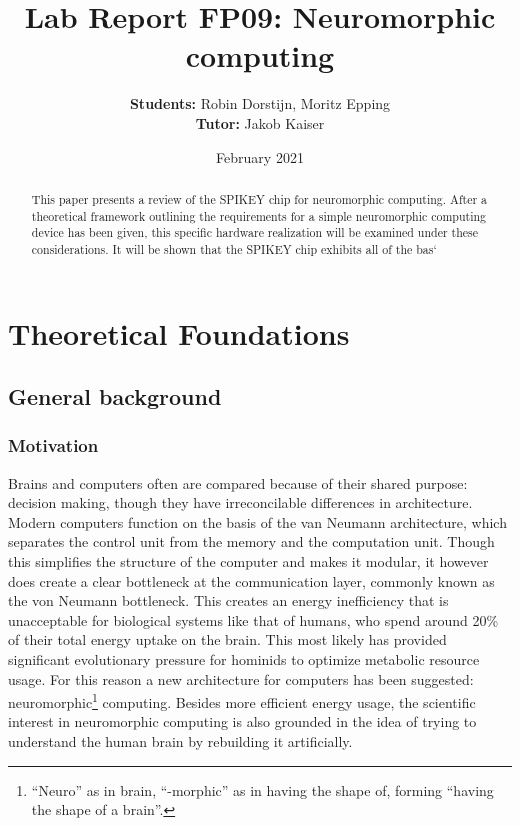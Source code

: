 \documentclass[10pt,a4paper]{article}
\author{\textbf{Students: }Robin Dorstijn, Moritz Epping \\ \textbf{Tutor: }Jakob Kaiser}
\title{Lab Report FP09: Neuromorphic computing}
\date{February 2021}
\begin{document}
\maketitle
\clearpage
\tableofcontents

\clearpage
\begin{abstract}
    This paper presents a review of the SPIKEY chip for neuromorphic
    computing.  After a theoretical framework outlining the requirements
    for a simple neuromorphic computing device has been given, this
    specific hardware realization will be examined under these considerations.
    It will be shown that the SPIKEY chip exhibits all of the bas`
\end{abstract}

\section{Theoretical Foundations}
\subsection{General background}
\subsubsection{Motivation}
Brains and computers often are compared because of their shared purpose:
decision making, though they have irreconcilable differences in architecture.
Modern computers function on the basis of the van Neumann
architecture\cite{von-Neumann}, which separates the control unit from the memory
and the computation unit. Though this simplifies the structure of the computer
and makes it modular, it however does create a clear bottleneck at the
communication layer, commonly known as the von Neumann bottleneck. This creates
an energy inefficiency that is unacceptable for biological systems like that of
humans, who spend around 20\% of their total energy uptake on the
brain\cite{metabolic-rates}.  This most likely has provided significant
evolutionary pressure for hominids to optimize metabolic resource
usage\cite{seymour2016fossil}. For this reason a new architecture for computers
has been suggested: neuromorphic\footnote{``Neuro'' as in brain, ``-morphic'' as
in having the shape of, forming ``having the shape of a brain''.} computing.
Besides more efficient energy usage,  the scientific interest in neuromorphic
computing is also grounded in the idea of trying to understand the human brain
by rebuilding it artificially.
\end{document}
